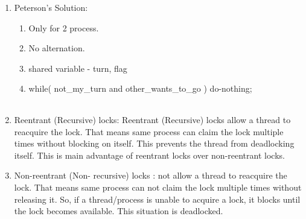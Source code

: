 \begin{enumerate}
  \item Peterson's Solution:
  \begin{enumerate}
    \item Only for 2 process.
    \item No alternation.
    \item shared variable - turn, flag
    \item while( not\_my\_turn and other\_wants\_to\_go ) do-nothing;
  \end{enumerate}
      \begin{myTableStyle}
        \begin{tabular}{ |m{6cm}|m{6cm}| } \hline
               &      \\ \hline
        \end{tabular}
      \end{myTableStyle}
      \vspace{0.08in}

      \item Reentrant (Recursive) locks: Reentrant (Recursive) locks allow a thread to reacquire the lock.
          That means same process can claim the lock multiple times without blocking on itself. This prevents the
          thread from deadlocking itself. This is main advantage of reentrant locks over non-reentrant locks.
      \item Non-reentrant (Non- recursive) locks : not allow a thread to reacquire the lock. That means same
          process can not claim the lock multiple times without releasing it. So, if a thread/process is unable
          to acquire a lock, it blocks until the lock becomes available. This situation is deadlocked.
\end{enumerate}









